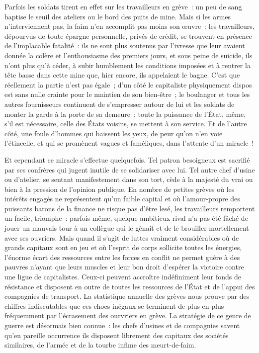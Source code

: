 \documentclass[french,twoside]{book} %
\begin{document}
 Parfois les soldats tirent en effet sur les travailleurs en grève : un peu de sang baptise le seuil des ateliers ou le bord des puits de mine. Mais si les armes n’interviennent pas, la faim n’en accomplit pas moins son œuvre : les travailleurs, dépourvus de toute épargne personnelle, privés de crédit, se trouvent en présence de l’implacable fatalité : ils ne sont plus soutenus par l’ivresse que leur avaient donnée la colère et l’enthousiasme des premiers jours, et sous peine de suicide, ils n’ont plus qu’à céder, à subir humblement les conditions imposées et à rentrer la tête basse dans cette mine que, hier encore, ils appelaient le bagne. C’est que réellement la partie n’est pas égale ; d’un côté le capitaliste physiquement dispos  est sans nulle crainte pour le maintien de son bien-être ; le boulanger et tous les autres fournisseurs continuent de s’empresser autour de lui et les soldats de monter la garde à la porte de sa demeure ; toute la puissance de l’État, même, s’il est nécessaire, celle des États voisins, se mettent à son service. Et de l’autre côté, une foule d’hommes qui baissent les yeux, de peur qu’on n’en voie l’étincelle, et qui se promènent vagues et faméliques, dans l’attente d’un miracle !\par
Et cependant ce miracle s’effectue quelquefois. Tel patron besoigneux est sacrifié par ses confrères qui jugent inutile de se solidariser avec lui. Tel autre chef d’usine ou d’atelier, se sentant manifestement dans son tort, cède à la  majesté du vrai ou bien à la pression de l’opinion publique. En nombre de petites grèves où les intérêts engagés ne représentent qu’un faible capital et où l’amour-propre des puissants barons de la finance ne risque pas d’être lesé, les travailleurs remportent un facile, triomphe : parfois même, quelque ambitieux rival n’a pas été fâché de jouer un mauvais tour à un collègue qui le gênait et de le brouiller mortellement avec ses ouvriers. Mais quand il s’agit de luttes vraiment considérables où de grands capitaux sont en jeu et où l’esprit de corps sollicite toutes les énergies, l’énorme écart des ressources entre les forces en conflit ne permet guère à des pauvres n’ayant que leurs muscles et leur bon droit d’espérer la victoire contre  une ligue de capitalistes. Ceux-ci peuvent accroître indéfiniment leur fonds de résistance et disposent en outre de toutes les ressources de l’État et de l’appui des compagnies de transport. La statistique annuelle des grèves nous prouve par des chiffres indiscutables que ces chocs inégaux se terminent de plus en plus fréquemment par l’écrasement des ourvriers en grève. La stratégie de ce genre de guerre est désormais bien connue : les chefs d’usines et de compagnies savent qu’en pareille occurrence ils disposent librement des capitaux des sociétés similaires, de l’armée et de la tourbe infime des meurt-de-faim.\par
\end{document}
